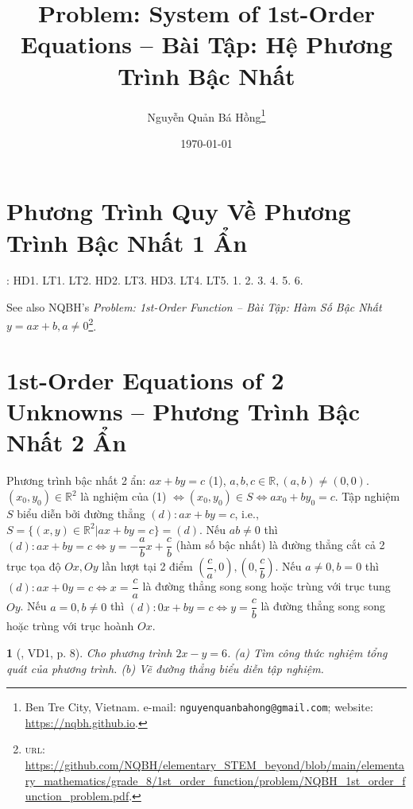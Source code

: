 \documentclass{article}
\title{Problem: System of 1st-Order Equations -- Bài Tập: Hệ Phương Trình Bậc Nhất}
\author{Nguyễn Quản Bá Hồng\footnote{Ben Tre City, Vietnam. e-mail: \texttt{nguyenquanbahong@gmail.com}; website: \url{https://nqbh.github.io}.}}
\date{\today}
\newtheorem{baitoan}{}
\begin{document}
\maketitle
\tableofcontents


\section{Phương Trình Quy Về Phương Trình Bậc Nhất 1 Ẩn}
\cite[\S1, pp. 5--11]{SGK_Toan_9_Canh_Dieu_tap_1}: HD1. LT1. LT2. HD2. LT3. HD3. LT4. LT5. 1. 2. 3. 4. 5. 6.

See also NQBH's \textit{Problem: 1st-Order Function -- Bài Tập: Hàm Số Bậc Nhất $y = ax + b,a\ne0$}\footnote{\textsc{url}: \url{https://github.com/NQBH/elementary_STEM_beyond/blob/main/elementary_mathematics/grade_8/1st_order_function/problem/NQBH_1st_order_function_problem.pdf}.}.


\section{1st-Order Equations of 2 Unknowns -- Phương Trình Bậc Nhất 2 Ẩn}
 Phương trình bậc nhất 2 ẩn: $ax + by = c$ (1), $a,b,c\in\mathbb{R},(a,b)\ne(0,0)$.  $(x_0,y_0)\in\mathbb{R}^2$ là nghiệm của (1) $\Leftrightarrow(x_0,y_0)\in S\Leftrightarrow ax_0 + by_0 = c$.  Tập nghiệm $S$ biểu diễn bởi đường thẳng $(d):ax + by = c$, i.e., $S = \{(x,y)\in\mathbb{R}^2|ax + by = c\} = (d)$.  Nếu $ab\ne0$ thì $(d):ax + by = c\Leftrightarrow y = -\dfrac{a}{b}x + \dfrac{c}{b}$ (hàm số bậc nhất) là đường thẳng cắt cả 2 trục tọa độ $Ox,Oy$ lần lượt tại 2 điểm $\left(\dfrac{c}{a},0\right),\left(0,\dfrac{c}{b}\right)$.  Nếu $a\ne0,b = 0$ thì $(d):ax + 0y = c\Leftrightarrow x = \dfrac{c}{a}$ là đường thẳng song song hoặc trùng với trục tung $Oy$.  Nếu $a = 0,b\ne0$ thì $(d):0x + by = c\Leftrightarrow y = \dfrac{c}{b}$ là đường thẳng song song hoặc trùng với trục hoành $Ox$.

\begin{baitoan}[\cite{Binh_boi_duong_Toan_9_tap_2}, VD1, p. 8]
	Cho phương trình $2x - y = 6$. (a) Tìm công thức nghiệm tổng quát của phương trình. (b) Vẽ đường thẳng biểu diễn tập nghiệm.
\end{baitoan}
\end{document}

